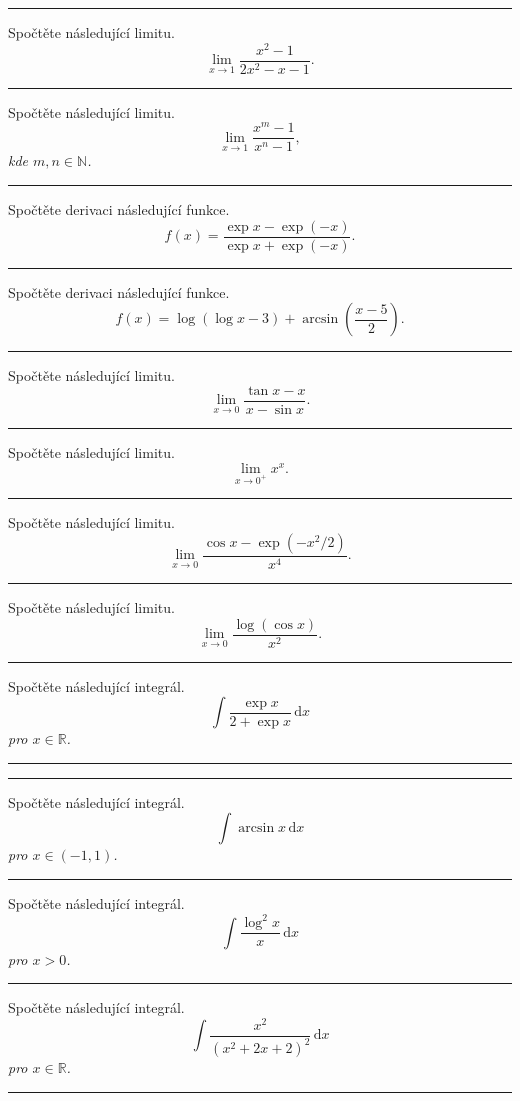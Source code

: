 \documentclass[a4paper,11pt]{article}
\newcommand{\R}{\mathbb{R}}
\newcommand{\N}{\mathbb{N}}
\newcommand{\calcthislimez}[1]{%
\par Spočtěte následující limitu.\\[.5em]%
\emph{#1}%
\vspace{\parskip}%
\hrule%
}
\newcommand{\calcthisderez}[1]{%
\par Spočtěte derivaci následující funkce.\\[.5em]%
\emph{#1}%
\vspace{\parskip}%
\hrule%
}
\newcommand{\calcthisintez}[1]{%
\par Spočtěte následující integrál.\\[.5em]%
\emph{#1}%
\vspace{\parskip}%
\hrule%
}
\begin{document}
 \clearpage
 \hrule
 \calcthislimez{
  \[
   \lim_{x \to 1} \frac{x^{2} - 1}{2 x^{2} - x - 1}.
  \]
 }
 \calcthislimez{
  \[
   \lim_{x \to 1} \frac{x^{m} - 1}{x^{n} - 1},
  \]
  kde $m,n \in \N$.
 }
 \calcthisderez{
  \[
   f(x) = \frac{\exp x - \exp (-x)}{\exp x + \exp(-x)}.
  \]
 }
 \calcthisderez{
  \[
   f(x) = \log(\log x - 3) + \arcsin \left( \frac{x-5}{2} \right).
  \]
 }
 \calcthislimez{
  \[
   \lim_{x \to 0} \frac{\tan x - x}{x - \sin x}.
  \]
 }
 \calcthislimez{
  \[
   \lim_{x \to 0^{+}} x^{x}.
  \]
 }
 \calcthislimez{
  \[
   \lim_{x \to 0} \frac{\cos x - \exp(-x^2 / 2)}{x^{4}}.
  \]
 }
 \calcthislimez{
  \[
   \lim_{x \to 0} \frac{\log(\cos x)}{x^2}.
  \]
 }
 \calcthisintez{
  \[
   \int \frac{\exp x}{2 + \exp x} \, \mathrm{d}x
  \]
  pro $x \in \R$.
 }
 
 \clearpage
 \hrule
 \calcthisintez{
  \[
   \int \arcsin x \, \mathrm{d}x
  \]
  pro $x \in (-1,1)$.
 }
 \calcthisintez{
  \[
   \int \frac{\log^2 x}{x} \, \mathrm{d}x
  \]
  pro $x > 0$.
 }
 \calcthisintez{
  \[
   \int \frac{x^2}{(x^2 + 2x + 2)^2} \, \mathrm{d}x
  \]
  pro $x \in \R$.
 }
\end{document}
